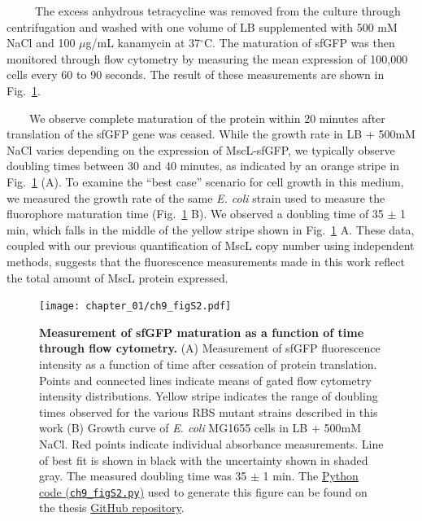 \documentclass[12pt]{caltech_thesis}
\begin{document}
~~~~~The excess anhydrous tetracycline was removed from the culture
through centrifugation and washed with one volume of LB supplemented
with 500 mM NaCl and 100 \(\mu\)g/mL kanamycin at 37\(^\circ\)C. The
maturation of sfGFP was then monitored through flow cytometry by
measuring the mean expression of 100,000 cells every 60 to 90 seconds.
The result of these measurements are shown in
Fig.~\ref{fig:maturation_time}.

~~~~We observe complete maturation of the protein within 20 minutes
after translation of the sfGFP gene was ceased. While the growth rate in
LB + 500mM NaCl varies depending on the expression of MscL-sfGFP, we
typically observe doubling times between 30 and 40 minutes, as indicated
by an orange stripe in Fig.~\ref{fig:maturation_time} (A). To examine
the ``best case'' scenario for cell growth in this medium, we measured
the growth rate of the same \emph{E. coli} strain used to measure the
fluorophore maturation time (Fig.~\ref{fig:maturation_time} B). We
observed a doubling time of 35 \(\pm\) 1 min, which falls in the middle
of the yellow stripe shown in Fig.~\ref{fig:maturation_time} A. These
data, coupled with our previous quantification of MscL copy number using
independent methods, suggests that the fluorescence measurements made in
this work reflect the total amount of MscL protein expressed.

\hypertarget{fig:maturation_time}{%
\begin{figure}
\centering
\texttt{[image: chapter\_01/ch9\_figS2.pdf]}
\caption[{Measurement of sfGFP maturation as a function of time through
flow cytometry.}]{\textbf{Measurement of sfGFP maturation as a function
of time through flow cytometry.} (A) Measurement of sfGFP fluorescence
intensity as a function of time after cessation of protein translation.
Points and connected lines indicate means of gated flow cytometry
intensity distributions. Yellow stripe indicates the range of doubling
times observed for the various RBS mutant strains described in this work
(B) Growth curve of \emph{E. coli} MG1655 cells in LB + 500mM NaCl. Red
points indicate individual absorbance measurements. Line of best fit is
shown in black with the uncertainty shown in shaded gray. The measured
doubling time was 35 \(\pm\) 1 min. The
\href{https://github.com/gchure/phd/blob/master/src/chapter_09/code/ch9_figS2.py}{Python
code (\texttt{ch9\_figS2.py})} used to generate this figure can be found
on the thesis \href{https://github.com/gchure/phd}{GitHub repository}.}
\label{fig:maturation_time}
\end{figure}
}
\end{document}
